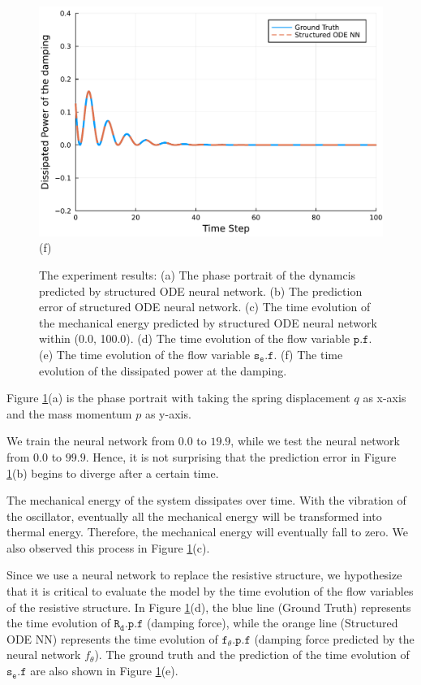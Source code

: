 \documentclass[
	parskip, 			   %
	twoside, 			   %
	DIV=14, 			   %
	BCOR=15.0mm, 		   %
	headsepline, 		   %
	open=right, 		   %
	captions=tableheading, %
	bibliography=totoc,    %
	numbers=noenddot       %
]{scrreprt}
\begin{document}
\begin{figure}[h!]
\begin{minipage}{.3\textwidth}
    \includegraphics[width=1\linewidth]{figures/dissipated_power_damping_idho.pdf}
    \\(f)
    \end{minipage}
    \caption{The experiment results: (a) The phase portrait of the dynamcis predicted by structured ODE neural network. (b) The prediction error of structured ODE neural network. (c) The time evolution of the mechanical energy predicted by structured ODE neural network within (0.0, 100.0). (d) The time evolution of the flow variable $\mathtt{p.f}$. (e) The time evolution of the flow variable $\mathtt{s_{e}.f}$. (f) The time evolution of the dissipated power at the damping.}
    \label{fig:idho_experiment}
\end{figure}

Figure \ref{fig:idho_experiment}(a) is the phase portrait with taking the spring displacement $q$ as x-axis and the mass momentum $p$ as y-axis.

We train the neural network from $0.0$ to $19.9$, while we test the neural network from $0.0$ to $99.9$. Hence, it is not surprising that the prediction error in Figure \ref{fig:idho_experiment}(b) begins to diverge after a certain time.

The mechanical energy of the system dissipates over time. With the vibration of the oscillator, eventually all the mechanical energy will be transformed into thermal energy. Therefore, the mechanical energy will eventually fall to zero. We also observed this process in Figure \ref{fig:idho_experiment}(c).

Since we use a neural network to replace the resistive structure, we hypothesize that it is critical to evaluate the model by the time evolution of the flow variables of the resistive structure. In Figure \ref{fig:idho_experiment}(d), the blue line (Ground Truth) represents the time evolution of $\mathtt{R_{d}.p.f}$ (damping force), while the orange line (Structured ODE NN) represents the time evolution of $\mathtt{f_{\theta}.p.f}$ (damping force predicted by the neural network $f_{\theta}$). The ground truth and the prediction of the time evolution of $\mathtt{s_e.f}$ are also shown in Figure \ref{fig:idho_experiment}(e).
\end{document}
